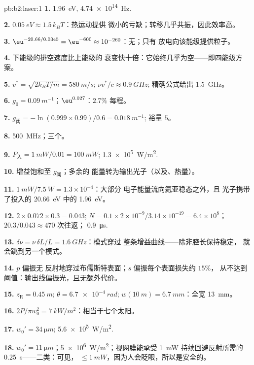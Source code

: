 \begin{solution}{pb:b2:laser:1}
\textbf{1.} \qty{1.96}{eV}, \qty{4.74e14}{Hz}.

\textbf{2.} $\qty{0.05}{eV} \approx 1.5\,k_BT$：热运动提供
微小的亏缺；转移几乎共振，因此效率高。

\textbf{3.} $\eu^{-20.66/0.0345} = \eu^{-600} \approx 10^{-260}$：无；只有
放电向该能级提供粒子。

\textbf{4.} 下能级的排空速度比上能级的
衰变快十倍：它始终几乎为空——即四能级方案。

\textbf{5.} $v^* = \sqrt{2k_BT/m} = \qty{580}{m/s}$; $\nu v^*/c \approx \qty{0.9}{GHz}$;
精确公式给出 \qty{1.5}{GHz}。

\textbf{6.} $g_0 = \qty{0.09}{m^{-1}}$；$\eu^{0.027}$：$2.7\%$ 每程。

\textbf{7.} $g_{\text{阈}} = -\ln(0.999 \times 0.99)/0.6 = \qty{0.018}{m^{-1}}$;
裕量 $5$。

\textbf{8.} \qty{500}{MHz}；三个。

\textbf{9.} $P_{\text{入}} = \qty{1}{mW}/0.01 = \qty{100}{mW}$; \qty{1.3e5}{W/m^2}.

\textbf{10.} 增益饱和至 $g_{\text{阈}}$；多余的
能量转为输出光子（以及、热量）。

\textbf{11.} $\qty{1}{mW}/\qty{7.5}{W} = 1.3 \times 10^{-4}$：大部分
电子能量流向氦亚稳态之外，且
光子携带了投入的 \qty{20.66}{eV} 中的 \qty{1.96}{eV}。

\textbf{12.} $2 \times 0.072 \times 0.3 = 0.043$; $N = 0.1 \times 2 \times 10^{-9}/3.14
\times 10^{-19} = 6.4 \times 10^8$；$20.3/0.043 \approx 470$ 次往返；
\qty{0.9}{\micro s}.

\textbf{13.} $\delta\nu = \nu\,\delta L/L = \qty{1.6}{GHz}$：模式穿过
整条增益曲线——除非腔长保持稳定，
就会跳到另一个模式。

\textbf{14.} $p$ 偏振无
反射地穿过布儒斯特表面；$s$ 偏振每个表面损失约 $15\%$，
从不达到阈值：输出线偏振光，且无额外代价。

\textbf{15.} $z_{\text{R}} = \qty{0.45}{m}$; $\theta = \qty{6.7e-4}{rad}$; $w(\qty{10}{m})
= \qty{6.7}{mm}$：全宽 \qty{13}{mm}。

\textbf{16.} $2P/\pi w_0^2 = \qty{7}{kW/m^2}$：相当于七个太阳。

\textbf{17.} $w_0' = \qty{34}{\micro m}$; \qty{5.6e5}{W/m^2}.

\textbf{18.} $w_0' = \qty{11}{\micro m}$；\qty{5e6}{W/m^2}；视网膜能承受
\qty{1}{mW} 持续回避反射所需的 \qty{0.25}{s}——二类：可见，
$\le \qty{1}{mW}$，因为人会眨眼，所以是安全的。


\end{solution}

